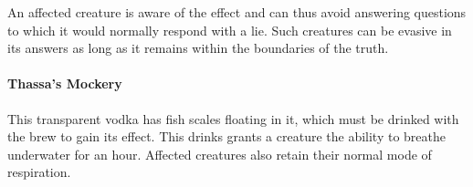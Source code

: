         An affected creature is aware of the effect and can thus avoid answering questions to which it would normally respond with a lie.
        Such creatures can be evasive in its answers as long as it remains within the boundaries of the truth.
    \paragraph{Thassa's Mockery} %
        This transparent vodka has fish scales floating in it, which must be drinked with the brew to gain its effect.
        This drinks grants a creature the ability to breathe underwater for an hour.
        Affected creatures also retain their normal mode of respiration.
\newpage
